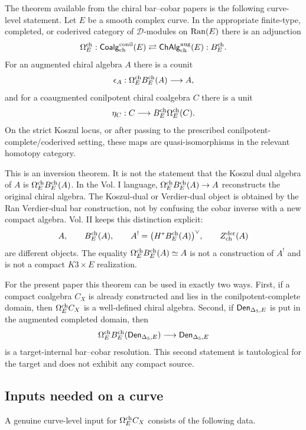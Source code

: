 The theorem available from the chiral bar--cobar papers is the following
curve-level statement.  Let \(E\) be a smooth complex curve.  In the
appropriate finite-type, completed, or coderived category of
\(\mathcal D\)-modules on \(\operatorname{Ran}(E)\) there is an adjunction
\[
        \Omega^{\mathrm{ch}}_E :
        \mathsf{Coalg}^{\mathrm{conil}}_{\mathrm{ch}}(E)
        \rightleftarrows
        \mathsf{ChAlg}^{\mathrm{aug}}_{\mathrm{ch}}(E) :
        B^{\mathrm{ch}}_E .
\]
For an augmented chiral algebra \(A\) there is a counit
\[
        \epsilon_A:\Omega^{\mathrm{ch}}_EB^{\mathrm{ch}}_E(A)\longrightarrow A ,
\]
and for a coaugmented conilpotent chiral coalgebra \(C\) there is a unit
\[
        \eta_C:C\longrightarrow B^{\mathrm{ch}}_E\Omega^{\mathrm{ch}}_E(C).
\]
On the strict Koszul locus, or after passing to the prescribed
conilpotent-complete/coderived setting, these maps are quasi-isomorphisms
in the relevant homotopy category.

This is an inversion theorem.  It is not the statement that the Koszul
dual algebra of \(A\) is \(\Omega^{\mathrm{ch}}_EB^{\mathrm{ch}}_E(A)\).  In the Vol. I language,
\(\Omega^{\mathrm{ch}}_EB^{\mathrm{ch}}_E(A)\to A\) reconstructs the original chiral algebra.  The
Koszul-dual or Verdier-dual object is obtained by the Ran Verdier-dual
bar construction, not by confusing the cobar inverse with a new compact
algebra.  Vol. II keeps this distinction explicit:
\[
        A,\qquad B^{\mathrm{ch}}_E(A),\qquad
        A^!=\bigl(H^\ast B^{\mathrm{ch}}_E(A)\bigr)^\vee,\qquad
        Z^{\mathrm{der}}_{\mathrm{ch}}(A)
\]
are different objects.  The equality
\(\Omega^{\mathrm{ch}}_EB^{\mathrm{ch}}_E(A)\simeq A\) is not a construction of \(A^!\) and is not
a compact \(K3\times E\) realization.

For the present paper this theorem can be used in exactly two ways.
First, if a compact coalgebra \(C_X\) is already constructed and lies in
the conilpotent-complete domain, then \(\Omega^{\mathrm{ch}}_E C_X\) is a well-defined
chiral algebra.  Second, if \(\mathsf{Den}_{\Delta_5,E}\) is put in the augmented completed
domain, then
\[
        \Omega^{\mathrm{ch}}_EB^{\mathrm{ch}}_E(\mathsf{Den}_{\Delta_5,E})\longrightarrow \mathsf{Den}_{\Delta_5,E}
\]
is a target-internal bar--cobar resolution.  This second statement is
tautological for the target and does not exhibit any compact source.

\subsection{Inputs needed on a curve}

A genuine curve-level input for \(\Omega^{\mathrm{ch}}_E C_X\) consists of the following
data.

